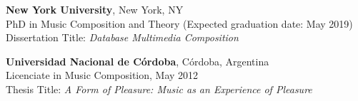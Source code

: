 \textbf{New York University}, New York, NY \\
PhD in Music Composition and Theory (Expected graduation date: May 2019)\hfill\\
Dissertation Title: {\sl Database Multimedia Composition}\hfill

\textbf{Universidad Nacional de Córdoba}, Córdoba, Argentina\\
Licenciate in Music Composition, May 2012\hfill\\
Thesis Title: {\sl A Form of Pleasure: Music as an Experience of Pleasure}